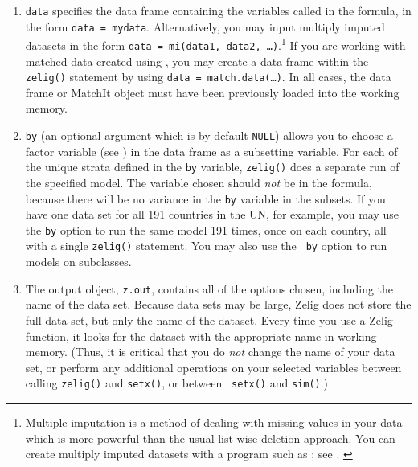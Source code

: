 \begin{enumerate}
\begin{enumerate}
  \item \texttt{data} specifies the data frame containing the
    variables called in the formula, in the form {\tt data = mydata}.
    Alternatively, you may input multiply imputed datasets in the form
    {\tt data = mi(data1, data2, \dots)}.\footnote{Multiple
      imputation is a method of dealing with missing values in your
      data which is more powerful than the usual list-wise deletion
      approach.  You can create multiply imputed datasets with a
      program such as
      ;
      see .
    \label{mi}}  If you are working with matched data created using
  , you may create a
  data frame within the {\tt zelig()} statement by using {\tt data =
    match.data(\dots)}.  In all cases, the data frame or MatchIt
  object must have been previously loaded into the working memory.
  
\item {\tt by} (an optional argument which is by default {\tt NULL})
  allows you to choose a factor variable (see ) in the
  data frame as a subsetting variable.  For each of the unique
  strata defined in the {\tt by} variable, {\tt zelig()} does a
  separate run of the specified model.  The variable chosen should
  \emph{not} be in the formula, because there will be no variance in
  the {\tt by} variable in the subsets.  If you have one data set for
  all 191 countries in the UN, for example, you may use the {\tt by}
  option to run the same model 191 times, once on each country, all
  with a single {\tt zelig()} statement.  You may also use the {\tt
    by} option to run models on
   subclasses.
  
\item The output object, {\tt z.out}, contains all of the options
  chosen, including the name of the data set.  Because data sets may
  be large, Zelig does not store the full data set, but only the name
  of the dataset.  Every time you use a Zelig function, it looks for
  the dataset with the appropriate name in working memory.  (Thus, it
  is critical that you do \emph{not} change the name of your data set,
  or perform any additional operations on your selected variables
  between calling {\tt zelig()} and {\tt setx()}, or between {\tt
    setx()} and {\tt sim()}.)
  

\end{enumerate}
\end{enumerate}
